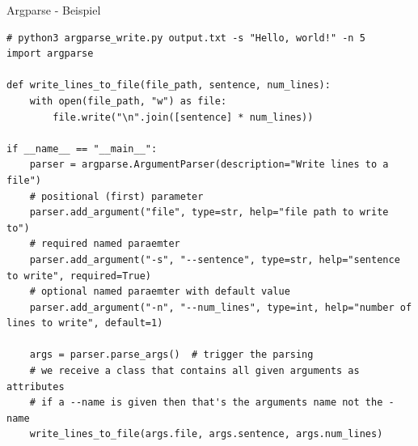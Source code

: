 \documentclass[12pt, aspectratio=169, usepdftitle=false]{beamer}
\begin{document}
\begin{frame}[fragile]{Argparse - Beispiel}
	\begin{lstlisting}[language=pytiny]
# python3 argparse_write.py output.txt -s "Hello, world!" -n 5
import argparse

def write_lines_to_file(file_path, sentence, num_lines):
    with open(file_path, "w") as file:
        file.write("\n".join([sentence] * num_lines))

if __name__ == "__main__":
    parser = argparse.ArgumentParser(description="Write lines to a file")
    # positional (first) parameter
    parser.add_argument("file", type=str, help="file path to write to")
    # required named paraemter
    parser.add_argument("-s", "--sentence", type=str, help="sentence to write", required=True)
    # optional named paraemter with default value
    parser.add_argument("-n", "--num_lines", type=int, help="number of lines to write", default=1)

    args = parser.parse_args()  # trigger the parsing
    # we receive a class that contains all given arguments as attributes
    # if a --name is given then that's the arguments name not the -name
    write_lines_to_file(args.file, args.sentence, args.num_lines)
	\end{lstlisting}
\end{frame}

\framecardfragen
\end{document}
